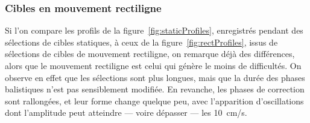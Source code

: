 	\subsubsection{Cibles en mouvement rectiligne}
	Si l'on compare les profils de la figure~\ref{fig:staticProfiles}, enregistrés pendant des sélections de cibles statiques, à ceux de la figure~\ref{fig:rectProfiles}, issus de sélections de cibles de mouvement rectiligne, on remarque déjà des différences, alors que le mouvement rectiligne est celui qui génère le moins de difficultés. On observe en effet que les sélections sont plus longues, mais que la durée des phases balistiques n'est pas sensiblement modifiée. En revanche, les phases de correction sont rallongées, et leur forme change quelque peu, avec l'apparition d'oscillations dont l'amplitude peut atteindre --- voire dépasser --- les 10~cm/s.
	
